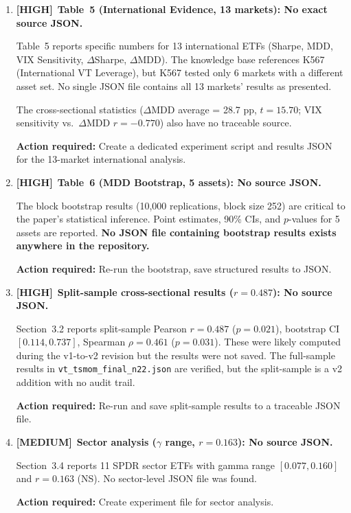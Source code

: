 \documentclass[12pt,a4paper]{article}
\newcommand{\HIGH}{\textcolor{highsev}{\textbf{[HIGH]}}}
\newcommand{\MEDIUM}{\textcolor{medsev}{\textbf{[MEDIUM]}}}
\begin{document}
\begin{enumerate}[label=\textbf{A.\arabic*}]
\textbf{Action required:} Create \texttt{experiments/kXXX\_dual\_mechanism\_2005.py} and \texttt{kXXX\_dual\_mechanism\_2005\_results.json} that computes all Table~3 numbers from raw data for the 2005--2026 period, covering SPY, 50/50, DIA, QQQ, and IWM. Update \texttt{generate\_figures.py} to read from this JSON instead of using hard-coded values.


\item \HIGH\ \textbf{Table~5 (International Evidence, 13 markets): No exact source JSON.}

Table~5 reports specific numbers for 13 international ETFs (Sharpe, MDD, VIX Sensitivity, $\Delta$Sharpe, $\Delta$MDD). The knowledge base references K567 (International VT Leverage), but K567 tested only 6 markets with a different asset set. No single JSON file contains all 13 markets' results as presented.

The cross-sectional statistics ($\Delta$MDD average = 28.7 pp, $t = 15.70$; VIX sensitivity vs.\ $\Delta$MDD $r = -0.770$) also have no traceable source.

\textbf{Action required:} Create a dedicated experiment script and results JSON for the 13-market international analysis.


\item \HIGH\ \textbf{Table~6 (MDD Bootstrap, 5 assets): No source JSON.}

The block bootstrap results (10,000 replications, block size 252) are critical to the paper's statistical inference. Point estimates, 90\% CIs, and $p$-values for 5 assets are reported. \textbf{No JSON file containing bootstrap results exists anywhere in the repository.}

\textbf{Action required:} Re-run the bootstrap, save structured results to JSON.


\item \HIGH\ \textbf{Split-sample cross-sectional results ($r = 0.487$): No source JSON.}

Section~3.2 reports split-sample Pearson $r = 0.487$ ($p = 0.021$), bootstrap CI $[0.114, 0.737]$, Spearman $\rho = 0.461$ ($p = 0.031$). These were likely computed during the v1-to-v2 revision but the results were not saved. The full-sample results in \texttt{vt\_tsmom\_final\_n22.json} are verified, but the split-sample is a v2 addition with no audit trail.

\textbf{Action required:} Re-run and save split-sample results to a traceable JSON file.


\item \MEDIUM\ \textbf{Sector analysis ($\gamma$ range, $r = 0.163$): No source JSON.}

Section~3.4 reports 11 SPDR sector ETFs with gamma range $[0.077, 0.160]$ and $r = 0.163$ (NS). No sector-level JSON file was found.

\textbf{Action required:} Create experiment file for sector analysis.

\end{enumerate}
\end{document}
